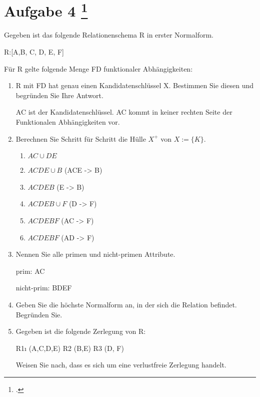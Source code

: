 \documentclass{lehramt-informatik-aufgabe}
\begin{document}
\let\FA=\liFunktionaleAbhaengigkeiten

\section{Aufgabe 4
\footcite{66116:2020:09}}

Gegeben ist das folgende Relationenschema R in erster Normalform.

R:{[A,B, C, D, E, F]}

Für R gelte folgende Menge FD funktionaler Abhängigkeiten:

\FA{
  AC -> DE;
  ACE -> B;
  E -> B;
  D -> F;
  AC -> F;
  AD -> F;
}

\begin{enumerate}


\item R mit FD hat genau einen Kandidatenschlüssel X. Bestimmen Sie
diesen und begründen Sie Ihre Antwort.

\begin{liAntwort}
AC ist der Kandidatenschlüssel. AC kommt in keiner rechten Seite der
Funktionalen Abhängigkeiten vor.
\end{liAntwort}


\item Berechnen Sie Schritt für Schritt die Hülle $X^+$ von $X := \{ K
\}$.

\begin{liAntwort}
\begin{enumerate}
\item $AC \cup DE$
\item $ACDE \cup B$ (ACE -> B)
\item $ACDEB$ (E -> B)
\item $ACDEB \cup F$ (D -> F)
\item $ACDEBF$ (AC -> F)
\item $ACDEBF$ (AD -> F)
\end{enumerate}
\end{liAntwort}


\item Nennen Sie alle primen und nicht-primen Attribute.

\begin{liAntowrt}
prim: AC

nicht-prim: BDEF
\end{liAntowrt}


\item Geben Sie die höchste Normalform an, in der sich die Relation befindet. Begründen Sie.


\item Gegeben ist die folgende Zerlegung von R:

R1ı (A,C,D,E)
R2 (B,E)
R3 (D, F)

Weisen Sie nach, dass es sich um eine verlustfreie Zerlegung handelt.

\end{enumerate}
\end{document}
